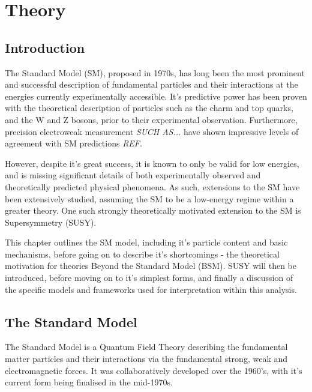 
\chapter{Theory}
\label{ch:2}

\ifpdf
    \graphicspath{{Chapter2/Figs/Raster/}{Chapter2/Figs/PDF/}{Chapter2/Figs/}}
\else
    \graphicspath{{Chapter2/Figs/Vector/}{Chapter2/Figs/}}
\fi


\section{Introduction}  %
\label{sec:theory_intro}

The Standard Model (SM), proposed in 1970s, has long been the most prominent and 
successful description of fundamental particles and their interactions at the
energies currently experimentally accessible. It's predictive power has been proven with the 
theoretical description of particles such as the charm and top quarks, and the W and
Z bosons, prior to their experimental observation. Furthermore, precision 
electroweak measurement \emph{SUCH AS...} have shown impressive levels of 
agreement with SM predictions \emph{REF}.

However, despite it's great success, it is known to only be valid for low 
energies, and is missing significant details of both experimentally 
observed and theoretically predicted physical phenomena. As such, extensions to
the SM have been extensively studied, assuming the SM to be a low-energy 
regime within a greater theory. One such strongly theoretically motivated extension 
to the SM is Supersymmetry (SUSY).

This chapter outlines the SM model, including it's particle content and basic 
mechanisms, before going on to describe it's shortcomings - the theoretical 
motivation for theories Beyond the Standard Model (BSM). SUSY will then be 
introduced, before moving on to it's simplest forms, and finally a discussion of
the specific models and frameworks used for interpretation within this analysis.

\section{The Standard Model}
\label{sec:theory_current}
The Standard Model is a Quantum Field Theory describing the fundamental 
matter particles and their interactions via the fundamental strong, weak and 
electromagnetic forces. It was collaboratively developed over the 1960's, with
it's current form being finalised in the mid-1970s.

